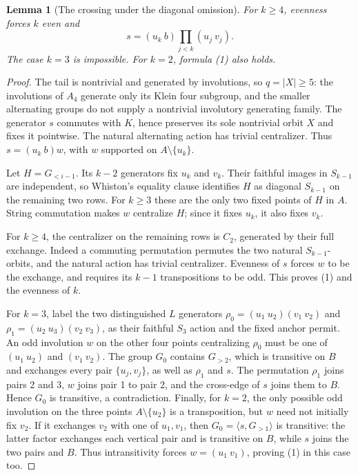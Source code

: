 \documentclass[11pt,a4paper]{article}
\newtheorem{lemma}{Lemma}
\newcommand{\gen}[1]{\langle#1\rangle}
\begin{document}
\begin{lemma}[The crossing under the diagonal omission]\label{crossing}
For $k\geq4$, evenness forces $k$ even and
\[
                   s=(u_k\ b)\prod_{j<k}(u_j\ v_j).       \tag{1}
\]
The case $k=3$ is impossible. For $k=2$, formula (1) also holds.
\end{lemma}
\begin{proof}
The tail is nontrivial and generated by involutions, so
$q=|X|\geq5$: the involutions of $A_4$ generate only its
Klein four subgroup, and the smaller alternating groups do
not supply a nontrivial involutory generating family.
The generator $s$ commutes with $K$, hence preserves its sole
nontrivial orbit $X$ and fixes it pointwise. The natural
alternating action has trivial centralizer. Thus
$s=(u_k\ b)w$, with $w$ supported on $A\setminus\{u_k\}$.

Let $H=G_{<i-1}$. Its $k-2$ generators fix $u_k$ and $v_k$.
Their faithful images in $S_{k-1}$ are independent, so Whiston's
equality clause identifies $H$ as diagonal $S_{k-1}$ on the
remaining two rows. For $k\geq3$ these are the only two fixed
points of $H$ in $A$. String commutation makes $w$ centralize
$H$; since it fixes $u_k$, it also fixes $v_k$.

For $k\geq4$, the centralizer on the remaining rows is $C_2$,
generated by their full exchange. Indeed a commuting permutation
permutes the two natural $S_{k-1}$-orbits, and the natural action
has trivial centralizer. Evenness of $s$ forces $w$ to be the
exchange, and requires its $k-1$ transpositions to be odd.
This proves (1) and the evenness of $k$.

For $k=3$, label the two distinguished $L$ generators
$\rho_0=(u_1\ u_2)(v_1\ v_2)$ and
$\rho_1=(u_2\ u_3)(v_2\ v_3)$, as their faithful $S_3$ action
and the fixed anchor permit. An odd involution $w$ on the other
four points centralizing $\rho_0$ must be one of
$(u_1\ u_2)$ and $(v_1\ v_2)$. The group $G_0$ contains
$G_{>2}$, which is transitive on $B$ and exchanges every pair
$\{u_j,v_j\}$, as well as $\rho_1$ and $s$.
The permutation $\rho_1$ joins pairs 2 and 3, $w$ joins pair 1
to pair 2, and the cross-edge of $s$ joins them to $B$.
Hence $G_0$ is transitive, a contradiction.
Finally, for $k=2$, the only possible odd involution on the
three points $A\setminus\{u_2\}$ is a transposition, but
$w$ need not initially fix $v_2$. If it exchanges $v_2$ with
one of $u_1,v_1$, then $G_0=\gen{s,G_{>1}}$ is transitive:
the latter factor exchanges each vertical pair and is transitive
on $B$, while $s$ joins the two pairs and $B$. Thus intransitivity
forces $w=(u_1\ v_1)$, proving (1) in this case too.
\end{proof}
\end{document}
